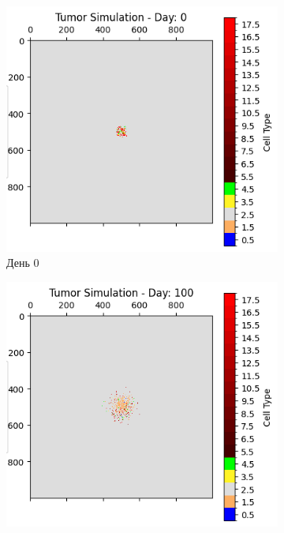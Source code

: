 \documentclass{article}
\begin{document}
\begin{figure}[H]
    \centering
    \begin{subfigure}[t]{0.32\linewidth}
        \centering
        \includegraphics[width=\linewidth]{tumor_immune_simulation_stats/tumor_immune_day_0.png}
        \caption{День 0}
        \label{fig:tumor-day-0-immune}
    \end{subfigure}
    \hfill
    \begin{subfigure}[t]{0.32\linewidth}
        \centering
        \includegraphics[width=\linewidth]{tumor_immune_simulation_stats/tumor_immune_day_100.png}

\end{subfigure}
\end{figure}
\end{document}
